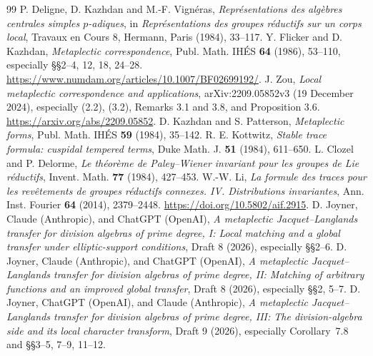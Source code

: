 \documentclass[11pt]{article}
\theoremstyle{plain}
\theoremstyle{definition}
\begin{document}
\begin{thebibliography}{99}
 P. Deligne, D. Kazhdan and M.-F. Vign\'eras,
\emph{Repr\'esentations des alg\`ebres centrales simples $p$-adiques},
in \emph{Repr\'esentations des groupes r\'eductifs sur un corps local},
Travaux en Cours 8, Hermann, Paris (1984), 33--117.
 Y. Flicker and D. Kazhdan,
\emph{Metaplectic correspondence}, Publ. Math. IH\'ES \textbf{64}
(1986), 53--110, especially \S\S2--4, 12, 18, 24--28.
\url{https://www.numdam.org/articles/10.1007/BF02699192/}.
 J. Zou,
\emph{Local metaplectic correspondence and applications},
arXiv:2209.05852v3 (19 December 2024), especially
(2.2), (3.2), Remarks 3.1 and 3.8, and Proposition 3.6.
\url{https://arxiv.org/abs/2209.05852}.
 D. Kazhdan and S. Patterson,
\emph{Metaplectic forms}, Publ. Math. IH\'ES \textbf{59}
(1984), 35--142.
 R. E. Kottwitz,
\emph{Stable trace formula: cuspidal tempered terms}, Duke Math. J.
\textbf{51} (1984), 611--650.
 L. Clozel and P. Delorme,
\emph{Le th\'eor\`eme de Paley--Wiener invariant pour les groupes de Lie
r\'eductifs}, Invent. Math. \textbf{77} (1984), 427--453.
 W.-W. Li,
\emph{La formule des traces pour les rev\^etements de groupes
r\'eductifs connexes. IV. Distributions invariantes},
Ann. Inst. Fourier \textbf{64} (2014), 2379--2448.
\url{https://doi.org/10.5802/aif.2915}.
 D. Joyner, Claude (Anthropic), and ChatGPT (OpenAI),
\emph{A metaplectic Jacquet--Langlands transfer for division algebras
of prime degree, I: Local matching and a global transfer under
elliptic-support conditions}, Draft 8 (2026), especially \S\S2--6.
 D. Joyner, Claude (Anthropic), and ChatGPT (OpenAI),
\emph{A metaplectic Jacquet--Langlands transfer for division algebras
of prime degree, II: Matching of arbitrary functions and an improved
global transfer}, Draft 8 (2026), especially \S\S2, 5--7.
 D. Joyner, ChatGPT (OpenAI), and Claude (Anthropic),
\emph{A metaplectic Jacquet--Langlands transfer for division algebras
of prime degree, III: The division-algebra side and its local
character transform}, Draft 9 (2026), especially Corollary~7.8
and \S\S3--5, 7--9, 11--12.
\end{thebibliography}
\end{document}

